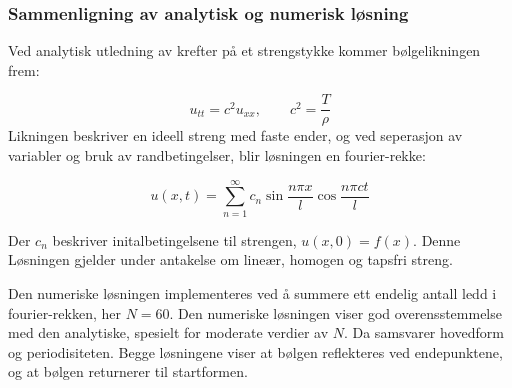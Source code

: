 \subsubsection{Sammenligning av analytisk og numerisk løsning}

Ved analytisk utledning av krefter på et strengstykke kommer bølgelikningen frem:

\begin{equation*}
	u_{tt} = c^2u_{xx}, \qquad c^2 = \frac{T}{\rho}
\end{equation*}
\clearpage
Likningen beskriver en ideell streng med faste ender, og ved seperasjon av variabler og bruk av 
randbetingelser, blir løsningen en fourier-rekke:

\begin{equation*}
	u(x,t) = \sum_{n=1}^{\infty} c_n \sin \frac{n \pi x}{l} \cos \frac{n \pi c t}{l}
\end{equation*}

Der $c_n$ beskriver initalbetingelsene til strengen, $u(x,0) = f(x)$. Denne Løsningen
gjelder under antakelse om lineær, homogen og tapsfri streng. 

Den numeriske løsningen implementeres ved å summere ett endelig antall ledd i fourier-rekken,
her $N=60$. Den numeriske løsningen viser god overensstemmelse med den analytiske, spesielt
for moderate verdier av $N$. Da samsvarer hovedform og periodisiteten. Begge løsningene viser
at bølgen reflekteres ved endepunktene, og at bølgen returnerer til startformen. 

